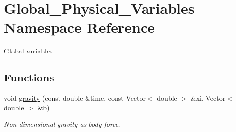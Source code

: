 \hypertarget{namespaceGlobal__Physical__Variables}{}\section{Global\+\_\+\+Physical\+\_\+\+Variables Namespace Reference}
\label{namespaceGlobal__Physical__Variables}


Global variables.  


\subsection*{Functions}
\begin{DoxyCompactItemize}
\item 
void \hyperlink{namespaceGlobal__Physical__Variables_a0777aef63372db7f91ad894c38159681}{gravity} (const double \&time, const Vector$<$ double $>$ \&xi, Vector$<$ double $>$ \&b)
\begin{DoxyCompactList}\small\item\em Non-\/dimensional gravity as body force. \end{DoxyCompactList}\end{DoxyCompactItemize}
